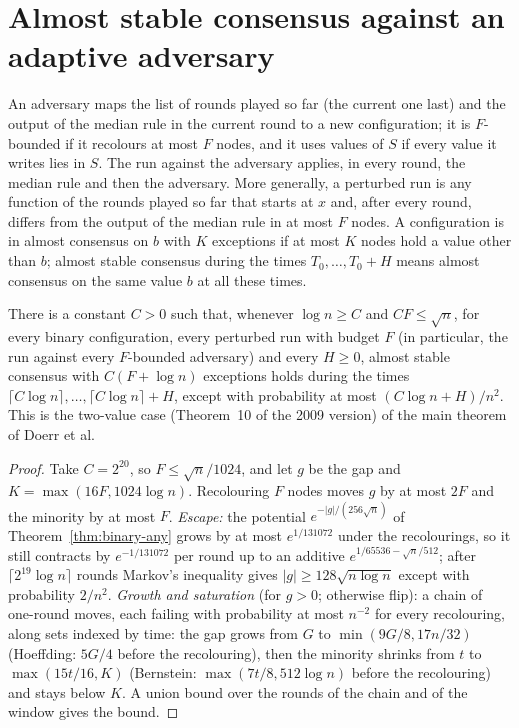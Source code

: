 \section{Almost stable consensus against an adaptive adversary}
\begin{definition}\label{def:adversary}
\leanok{}
An adversary maps the list of rounds played so far (the current one last) and the output of the
median rule in the current round to a new configuration; it is $F$-bounded if it recolours at
most $F$ nodes, and it uses values of $S$ if every value it writes lies in $S$. The run against
the adversary applies, in every round, the median rule and then the adversary. More generally, a
perturbed run is any function of the rounds played so far that starts at $x$ and, after every
round, differs from the output of the median rule in at most $F$ nodes. A configuration is in
almost consensus on $b$ with $K$ exceptions if at most $K$ nodes hold a value other than $b$;
almost stable consensus during the times $T_0,\dots,T_0+H$ means almost consensus on the same
value $b$ at all these times.
\end{definition}
\begin{theorem}\label{thm:binary-adv}
\leanok{}
There is a constant $C>0$ such that, whenever $\log n\ge C$ and $CF\le\sqrt n$, for every binary
configuration, every perturbed run with budget $F$ (in particular, the run against every
$F$-bounded adversary) and every $H\ge0$, almost stable consensus with $C(F+\log n)$ exceptions
holds during the times $\lceil C\log n\rceil,\dots,\lceil C\log n\rceil+H$, except with
probability at most $(C\log n+H)/n^2$. This is the two-value case (Theorem~10 of the 2009
version) of the main theorem of Doerr et al.
\end{theorem}
\begin{proof}\leanok
Take $C=2^{20}$, so $F\le\sqrt n/1024$, and let $g$ be the gap and $K=\max(16F,1024\log n)$.
Recolouring $F$ nodes moves $g$ by at most $2F$ and the minority by at most $F$.
\emph{Escape:} the potential $e^{-|g|/(256\sqrt n)}$ of Theorem~\ref{thm:binary-any} grows by at
most $e^{1/131072}$ under the recolourings, so it still contracts by $e^{-1/131072}$ per round up
to an additive $e^{1/65536-\sqrt n/512}$; after $\lceil 2^{19}\log n\rceil$ rounds Markov's
inequality gives $|g|\ge 128\sqrt{n\log n}$ except with probability $2/n^2$. \emph{Growth and
saturation} (for $g>0$; otherwise flip): a chain of one-round moves, each failing with
probability at most $n^{-2}$ for every recolouring, along sets indexed by time: the gap grows from
$G$ to $\min(9G/8,17n/32)$ (Hoeffding: $5G/4$ before the recolouring), then the minority shrinks
from $t$ to $\max(15t/16,K)$ (Bernstein: $\max(7t/8,512\log n)$ before the recolouring) and stays
below $K$. A union bound over the rounds of the chain and of the window gives the bound.
\end{proof}
